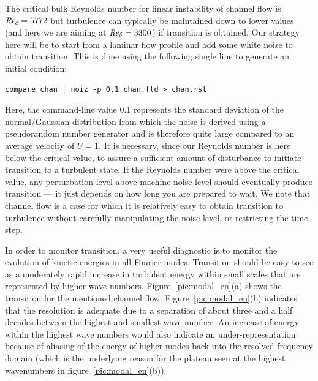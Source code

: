 \documentclass[11pt]{report}
\def\Rey{\mbox{\it Re}}                             %
\begin{document}
The critical bulk Reynolds number for linear instability of channel
flow is $\Rey_c = 5772$ but turbulence can typically be maintained down
to lower values (and here we are aiming at $\Rey_\delta=3300$) if
transition is obtained. Our strategy here will be to start from a
laminar flow profile and add some white noise to obtain transition.
This is done using the following single line to generate an initial
condition: {\small
\begin{verbatim}
compare chan | noiz -p 0.1 chan.fld > chan.rst
\end{verbatim}
}

Here, the command-line value 0.1 represents the standard deviation of
the normal/Gaussian distribution from which the noise is derived using
a pseudorandom number generator and is therefore quite large compared
to an average velocity of $U=1$. It is necessary, since our Reynolds
number is here below the critical value, to assure a sufficient amount
of disturbance to initiate transition to a turbulent state. If the
Reynolds number were above the critical value, any perturbation level
above machine noise level should eventually produce transition --- it
just depends on how long you are prepared to wait. We note that
channel flow is a case for which it is relatively easy to obtain
transition to turbulence without carefully manipulating the noise
level, or restricting the time step.

In order to monitor transition, a very useful diagnostic is to monitor
the evolution of kinetic energies in all Fourier modes.  Transition
should be easy to see as a moderately rapid increase in turbulent
energy within small scales that are represented by higher wave
numbers. Figure~\ref{pic:modal_en}(a) shows the transition for the
mentioned channel flow. Figure~\ref{pic:modal_en}(b) indicates that
the resolution is adequate due to a separation of about three and a
half decades between the highest and smallest wave number. An increase
of energy within the highest wave numbers would also indicate an
under-representation because of aliasing of the energy of higher modes
back into the resolved frequency domain (which is the underlying
reason for the plateau seen at the highest wavenumbers in
figure~\ref{pic:modal_en}(b)).
\end{document}
